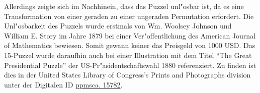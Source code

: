 Allerdings zeigte sich im Nachhinein, dass das Puzzel unl"osbar ist, da es eine Transformation von einer geraden zu einer ungeraden Permutation erfordert.\autocite{wiki-15-puzzle:online} Die Unl"osbarkeit des Puzzels wurde erstmals von Wm. Woolsey Johnson und William E. Story im Jahre 1879 bei einer Ver"offentlichung des American Journal of Mathematics bewiesen. \autocite{ajom-notes-15-puzzle:article}
Somit gewann keiner das Preisgeld von 1000 USD. Das 15-Puzzel wurde daraufhin auch bei einer Illustration mit dem Titel \enquote{The Great Presidential Puzzle} der US-Pr"asidentschaftswahl 1880 referenziert. Zu finden ist dies in der United States Library of Congress's Prints and Photographs division unter der Digitalen ID \href{https://www.loc.gov/rr/print/}{ppmsca. 15782}. \autocite{presidental-puzzle:online}